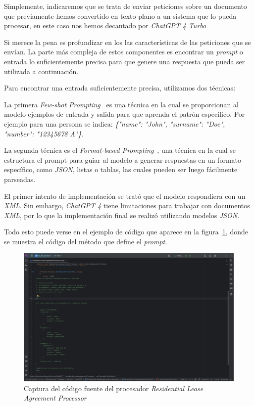 Simplemente, indicaremos que se trata de enviar peticiones sobre un documento que previamente hemos convertido en texto
plano a un sistema que lo pueda procesar, en este caso nos hemos decantado por \textit{ChatGPT 4 Turbo}~\cite{url_gpt4}

Si merece la pena es profundizar en los las características de las peticiones que se envían.
La parte más compleja de estos componentes es encontrar un \textit{prompt} o entrada lo suficientemente precisa para que
genere una respuesta que pueda ser utilizada a continuación.

Para encontrar una entrada suficientemente precisa, utilizamos dos técnicas:

La primera \textit{Few-shot Prompting}~\cite{article_few_shot_prompting} es una técnica en la cual se proporcionan
al modelo ejemplos de entrada y salida para que aprenda el patrón específico.
Por ejemplo para una persona se indica: \textit{\{"name": "John", "surname": "Doe", "number": "12345678 A"\}}.

La segunda técnica es el \textit{Format-based Prompting}~\cite{article_format_based_prompting}, una técnica en la
cual se estructura el prompt para guiar al modelo a generar respuestas en un formato específico, como \textit{JSON},
listas o tablas, las cuales pueden ser luego fácilmente parseadas.

El primer intento de implementación se trató que el modelo respondiera con un \textit{XML}.
Sin embargo, \textit{ChatGPT 4} tiene limitaciones para trabajar con documentos \textit{XML}, por lo que la
implementación final se realizó utilizando modelos \textit{JSON}.

Todo esto puede verse en el ejemplo de código que aparece en la
figura~\ref{fig:chapter_4.4.residential_lease_agreement_processor}, donde se muestra el código del método que define el
\textit{prompt}.

\begin{figure}[ht]
    \begin{center}
        \includegraphics[width=\textwidth]{./chapter/4/images/chapter_4.4.residential_lease_agreement_processor}
        \caption{Captura del código fuente del procesador \textit{Residential Lease Agreement Processor}}
        \label{fig:chapter_4.4.residential_lease_agreement_processor}
    \end{center}
\end{figure}

